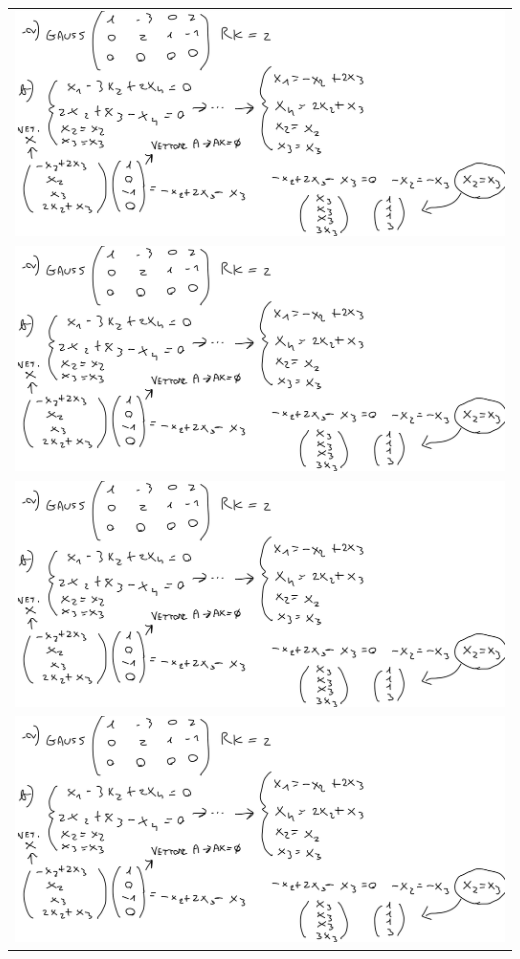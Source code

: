 \documentclass[10pt]{article}
\begin{document}
\begin{landscape}
\noindent
\begin{minipage}[t]{0.49\textwidth}
\begin{tabular}{c}
    \includegraphics[scale=0.12]{es1.jpeg} \\ 
    \includegraphics[scale=0.12]{es1.jpeg} \\
    \includegraphics[scale=0.12]{es1.jpeg} \\
    \includegraphics[scale=0.12]{es1.jpeg} \\

\end{tabular}
\end{minipage}
\end{landscape}
\end{document}
